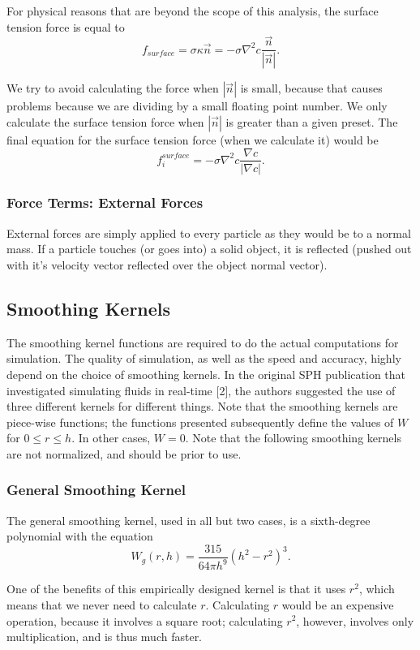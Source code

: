 \documentclass[a4paper]{article}
\begin{document}
For physical reasons that are beyond the scope of this analysis, the surface tension force is equal to
\[f_{surface} = \sigma \kappa \vec n = -\sigma \nabla^2 c \frac{\vec n}{|\vec n|}.\]

We try to avoid calculating the force when $|\vec n|$ is small, because that causes problems because we are dividing by a small floating point number. We only calculate the surface tension force when $|\vec n|$ is greater than a given preset. The final equation for the surface tension force (when we calculate it) would be
\[f^{surface}_i = -\sigma \nabla^2 c \frac{\nabla c}{|\nabla c|}.\]

\subsubsection*{Force Terms: External Forces}
External forces are simply applied to every particle as they would be to a normal mass. If a particle touches (or goes into) a solid object, it is reflected (pushed out with it's velocity vector reflected over the object normal vector).

\subsection*{Smoothing Kernels}
The smoothing kernel functions are required to do the actual computations for simulation. The quality of simulation, as well as the speed and accuracy, highly depend on the choice of smoothing kernels. In the original SPH publication that investigated simulating fluids in real-time [2], the authors suggested the use of three different kernels for different things. Note that the smoothing kernels are piece-wise functions; the functions presented subsequently define the values of $W$ for $0 \leq r \leq h$. In other cases, $W = 0.$ Note that the following smoothing kernels are not normalized, and should be prior to use.

\subsubsection*{General Smoothing Kernel}
The general smoothing kernel, used in all but two cases, is a sixth-degree polynomial with the equation
\[W_{g}(r, h) = \frac{315}{64\pi h^9} \left(h^2 - r^2\right)^3.\]

One of the benefits of this empirically designed kernel is that it uses $r^2$, which means that we never need to calculate $r$. Calculating $r$ would be an expensive operation, because it involves a square root; calculating $r^2$, however, involves only multiplication, and is thus much faster.
\end{document}
